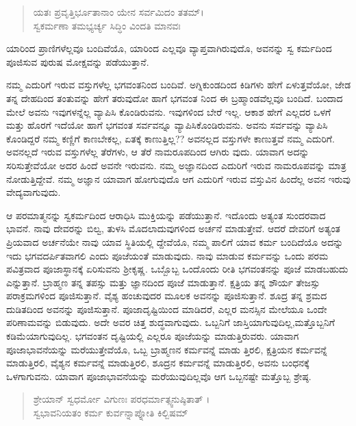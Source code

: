 \begin{verse}
ಯತಃ ಪ್ರವೃತ್ತಿರ್ಭೂತಾನಾಂ ಯೇನ ಸರ್ವಮಿದಂ ತತಮ್​।\\ಸ್ವಕರ್ಮಣಾ ತಮಭ್ಯರ್ಚ್ಯ ಸಿದ್ಧಿಂ ವಿಂದತಿ ಮಾನವಃ 
\end{verse}

{\small ಯಾರಿಂದ ಪ್ರಾಣಿಗಳೆಲ್ಲವೂ ಬಂದಿವೆಯೊ, ಯಾರಿಂದ ಎಲ್ಲವೂ ವ್ಯಾಪ್ತವಾಗಿರುವುದೊ, ಅವನನ್ನು ಸ್ವ ಕರ್ಮದಿಂದ ಪೂಜಿಸುವ ಪುರುಷ ಮೋಕ್ಷವನ್ನು ಪಡೆಯುತ್ತಾನೆ.}

ನಮ್ಮ ಎದುರಿಗೆ ಇರುವ ವಸ್ತುಗಳೆಲ್ಲ ಭಗವಂತನಿಂದ ಬಂದಿವೆ. ಅಗ್ನಿಕುಂಡದಿಂದ ಕಿಡಿಗಳು ಹೇಗೆ ಏಳುತ್ತವೆಯೋ, ಜೇಡ ತನ್ನ ದೇಹದಿಂದ ತಂತುವನ್ನು ಹೇಗೆ ತರುವುದೋ ಹಾಗೆ ಭಗವಂತ ನಿಂದ ಈ ಬ್ರಹ್ಮಾಂಡವೆಲ್ಲವೂ ಬಂದಿದೆ. ಬಂದಾದ ಮೇಲೆ ಅವನು ಇವುಗಳನ್ನೆಲ್ಲ ವ್ಯಾಪಿಸಿ ಕೊಂಡಿರುವನು. ಇವುಗಳಿಂದ ಬೇರೆ ಇಲ್ಲ. ಆಕಾಶ ಹೇಗೆ ಎಲ್ಲದರ ಒಳಗೆ ಮತ್ತು ಹೊರಗೆ ಇದೆಯೋ ಹಾಗೆ ಭಗವಂತ ಸರ್ವವನ್ನೂ ವ್ಯಾಪಿಸಿಕೊಂಡಿರುವನು. ಅವನು ಸರ್ವವನ್ನು ವ್ಯಾಪಿಸಿ ಕೊಂಡಿದ್ದರೆ ನಮ್ಮ ಕಣ್ಣಿಗೆ ಕಾಣಬೇಕಲ್ಲ, ಏತಕ್ಕೆ ಕಾಣುತ್ತಿಲ್ಲ?? ಅವನಲ್ಲದ ವಸ್ತುಗಳೇ ಕಾಣುತ್ತವೆ ನಮ್ಮ ಎದುರಿಗೆ. ಅವನಲ್ಲದೆ ಇರುವ ವಸ್ತುಗಳೆಲ್ಲ ತೆರೆಗಳು, ಆ ತೆರೆ ನಾಮರೂಪದಿಂದ ಆಗಿರು ವುದು. ಯಾವಾಗ ಅದನ್ನು ಸರಿಸುತ್ತೇವೆಯೋ ಅದರ ಹಿಂದೆ ಅವನೇ ಇರುವನು. ನಮ್ಮ ಅಜ್ಞಾನದಿಂದ ಎದುರಿಗೆ ಇರುವ ನಾಮರೂಪವನ್ನು ಮಾತ್ರ ನೋಡುತ್ತಿದ್ದೇವೆ. ನಮ್ಮ ಅಜ್ಞಾನ ಯಾವಾಗ ಹೋಗುವುದೊ ಆಗ ಎದುರಿಗೆ ಇರುವ ವಸ್ತುವಿನ ಹಿಂದೆಲ್ಲ ಅವನ ಇರುವು ವೇದ್ಯವಾಗುವುದು.

ಆ ಪರಮಾತ್ಮನನ್ನು ಸ್ವಕರ್ಮದಿಂದ ಆರಾಧಿಸಿ ಮುಕ್ತಿಯನ್ನು ಪಡೆಯುತ್ತಾನೆ. ಇದೊಂದು ಅತ್ಯಂತ ಸುಂದರವಾದ ಭಾವನೆ. ನಾವು ದೇವರನ್ನು ಬಿಲ್ವ, ತುಳಸಿ ಮೊದಲಾದುವುಗಳಿಂದ ಅರ್ಚನೆ ಮಾಡುತ್ತೇವೆ. ಆದರೆ ದೇವರಿಗೆ ಅತ್ಯಂತ ಪ್ರಿಯವಾದ ಅರ್ಚನೆಯೇ ನಾವು ಯಾವ ಸ್ಥಿತಿಯಲ್ಲಿ ದ್ದೇವೆಯೊ, ನಮ್ಮ ಪಾಲಿಗೆ ಯಾವ ಕರ್ಮ ಬಂದಿದೆಯೊ ಅದನ್ನು ಇದು ಭಗವದರ್ಪಿತವಾಗಲಿ ಎಂದು ಪೂಜೆಯಂತೆ ಮಾಡುವುದು. ನಾವು ಮಾಡುವ ಕರ್ಮವನ್ನು ಒಂದು ಪರಮ ಪವಿತ್ರವಾದ ಪೂಜಾಸ್ಥಾನಕ್ಕೆ ಏರಿಸುವನು ಶ್ರೀಕೃಷ್ಣ. ಒಬ್ಬೊಬ್ಬ ಒಂದೊಂದು ರೀತಿ ಭಗವಂತನನ್ನು ಪೂಜೆ ಮಾಡಬಹುದು ಎನ್ನುತ್ತಾನೆ. ಬ್ರಾಹ್ಮಣ ತನ್ನ ತಪಸ್ಸು ಮತ್ತು ಜ್ಞಾನದಿಂದ ಪೂಜೆ ಮಾಡುತ್ತಾನೆ. ಕ್ಷತ್ರಿಯ ತನ್ನ ಶೌರ್ಯ ತೇಜಸ್ಸು ಪರಾಕ್ರಮಗಳಿಂದ ಪೂಜಿಸುತ್ತಾನೆ. ವೈಶ್ಯ ಹಂಚುವುದರ ಮೂಲಕ ಅವನನ್ನು ಪೂಜಿಸುತ್ತಾನೆ. ಶೂದ್ರ ತನ್ನ ಶ್ರಮದ ದುಡಿತದಿಂದ ಅವನನ್ನು ಪೂಜಿಸುತ್ತಾನೆ. ಪೂಜಾದೃಷ್ಟಿಯಿಂದ ಮಾಡಿದರೆ, ಎಲ್ಲರ ಮನಸ್ಸಿನ ಮೇಲೆಯೂ ಒಂದೇ ಪರಿಣಾಮವನ್ನು ಬಿಡುವುದು. ಅದೇ ಅವರ ಚಿತ್ತ ಶುದ್ಧವಾಗುವುದು. ಒಬ್ಬನಿಗೆ ಜಾಸ್ತಿಯಾಗುವುದಿಲ್ಲ,ಮತ್ತೊಬ್ಬನಿಗೆ ಕಡಿಮೆಯಾಗುವುದಿಲ್ಲ. ಭಗವಂತನ ದೃಷ್ಟಿಯಲ್ಲಿ ಎಲ್ಲರೂ ಪೂಜೆಯನ್ನು ಮಾಡುತ್ತಿರುವರು. ಯಾವಾಗ ಪೂಜಾಭಾವನೆಯನ್ನು ಮರೆಯುತ್ತೇವೆಯೊ, ಒಬ್ಬ ಬ್ರಾಹ್ಮಣನ ಕರ್ಮವನ್ನೆ ಮಾಡು ತ್ತಿರಲಿ, ಕ್ಷತ್ರಿಯನ ಕರ್ಮವನ್ನೆ ಮಾಡುತ್ತಿರಲಿ, ವೈಶ್ಯನ ಕರ್ಮವನ್ನೆ ಮಾಡುತ್ತಿರಲಿ, ಶೂದ್ರನ ಕರ್ಮವನ್ನೆ ಮಾಡುತ್ತಿರಲಿ, ಅವನು ಬಂಧನಕ್ಕೆ ಒಳಗಾಗುವನು. ಯಾವಾಗ ಪೂಜಾಭಾವನೆಯನ್ನು ಮರೆಯುವುದಿಲ್ಲವೊ ಆಗ ಒಬ್ಬನಷ್ಟೇ ಮತ್ತೊಬ್ಬ ಶ್ರೇಷ್ಠ.

\begin{verse}
ಶ್ರೇಯಾನ್ ಸ್ವಧರ್ಮೋ ವಿಗುಣಃ ಪರಧರ್ಮಾತ್ಸ್ವನುಷ್ಠಿತಾತ್ ।\\ಸ್ವಭಾವನಿಯತಂ ಕರ್ಮ ಕುರ್ವನ್ನಾಪ್ನೋತಿ ಕಿಲ್ಬಿಷಮ್ 
\end{verse}

